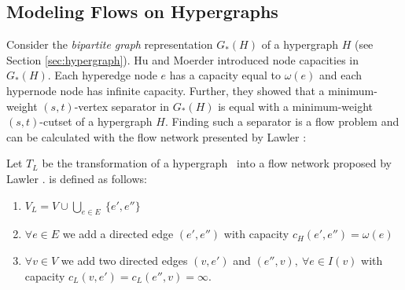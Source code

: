 
\subsection{Modeling Flows on Hypergraphs}
\label{sec:related_lawler}

Consider the \emph{bipartite graph} representation $G_*(H)$ of a hypergraph $H$ (see Section \ref{sec:hypergraph}).
Hu and Moerder \cite{HuMoerder85} introduced node capacities in $G_*(H)$. Each hyperedge
node $e$ has a capacity equal to $\omega(e)$ and each hypernode node has infinite capacity. 
Further, they showed that a minimum-weight $(s,t)$-vertex separator in $G_*(H)$
is equal with a minimum-weight $(s,t)$-cutset of a hypergraph $H$. 
Finding such a separator is a flow problem and can be calculated with the flow network  
presented by Lawler \cite{lawler1973}:

\begin{definition}
Let $T_L$ be the transformation of a hypergraph \HypergraphDef~into 
a flow network  proposed by Lawler \cite{lawler1973}.  is defined as follows:
\begin{enumerate}
\item $V_L = V \cup \bigcup\limits_{e \in E}\ \{e', e''\}$
\item $\forall e \in E$ we add a directed edge $(e',e'')$ 
      with capacity $c_H(e',e'') = \omega(e)$
\item $\forall v \in V$ we add two directed edges $(v, e')$ and 
      $(e'', v),\ \forall e \in I(v)$ with 
      capacity $c_L(v, e') = c_L(e'',v) = \infty$.
\end{enumerate} 
\end{definition}

